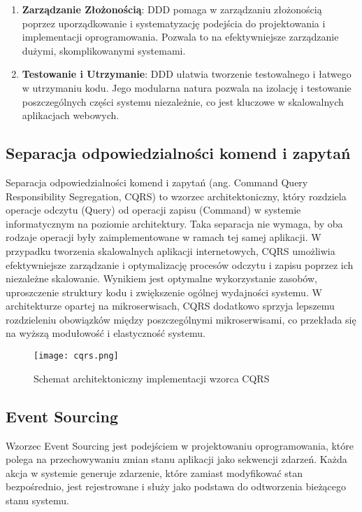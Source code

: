 \begin{enumerate}
    \item \textbf{Zarządzanie Złożonością}: DDD pomaga w zarządzaniu złożonością poprzez uporządkowanie i systematyzację podejścia do projektowania i implementacji oprogramowania. Pozwala to na efektywniejsze zarządzanie dużymi, skomplikowanymi systemami.

    \item \textbf{Testowanie i Utrzymanie}: DDD ułatwia tworzenie testowalnego i łatwego w utrzymaniu kodu. Jego modularna natura pozwala na izolację i testowanie poszczególnych części systemu niezależnie, co jest kluczowe w skalowalnych aplikacjach webowych.
\end{enumerate}

\subsection{Separacja odpowiedzialności komend i zapytań}

Separacja odpowiedzialności komend i zapytań (ang. Command Query Responsibility Segregation, CQRS) to wzorzec architektoniczny, który rozdziela operacje odczytu (Query) od operacji zapisu (Command) w systemie informatycznym na poziomie architektury. Taka separacja nie wymaga, by oba rodzaje operacji były zaimplementowane w ramach tej samej aplikacji. W przypadku tworzenia skalowalnych aplikacji internetowych, CQRS umożliwia efektywniejsze zarządzanie i optymalizację procesów odczytu i zapisu poprzez ich niezależne skalowanie. Wynikiem jest optymalne wykorzystanie zasobów, uproszczenie struktury kodu i zwiększenie ogólnej wydajności systemu. W architekturze opartej na mikroserwisach, CQRS dodatkowo sprzyja lepszemu rozdzieleniu obowiązków między poszczególnymi mikroserwisami, co przekłada się na wyższą modułowość i elastyczność systemu.

\begin{figure}[!h]
    \centering \texttt{[image: cqrs.png]}
    \caption{Schemat architektoniczny implementacji wzorca CQRS}
\end{figure}

\subsection{Event Sourcing}

Wzorzec Event Sourcing jest podejściem w projektowaniu oprogramowania, które polega na przechowywaniu zmian stanu aplikacji jako sekwencji zdarzeń. Każda akcja w systemie generuje zdarzenie, które zamiast modyfikować stan bezpośrednio, jest rejestrowane i służy jako podstawa do odtworzenia bieżącego stanu systemu.

